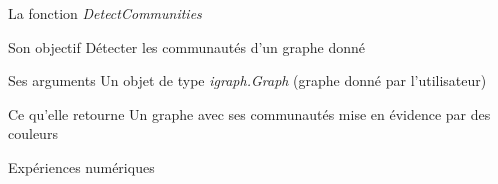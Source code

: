 \documentclass[11pt]{beamer}
\begin{document}
	\begin{frame}{La fonction \textit{DetectCommunities}}
		\begin{block}{Son objectif}
			Détecter les communautés d'un graphe donné
		\end{block}	
		\begin{block}{Ses arguments}
			Un objet de type \textit{igraph.Graph} (graphe donné par l'utilisateur)
		\end{block}
		\begin{block}{Ce qu'elle retourne}
			Un graphe avec ses communautés mise en évidence par des couleurs
		\end{block}                            
	\end{frame}
	
	\begin{frame}{Expériences numériques}
		\begin{figure}[htp] 
			\centering
			\hfill%
		\end{figure}
	\end{frame}
	
\end{document}
